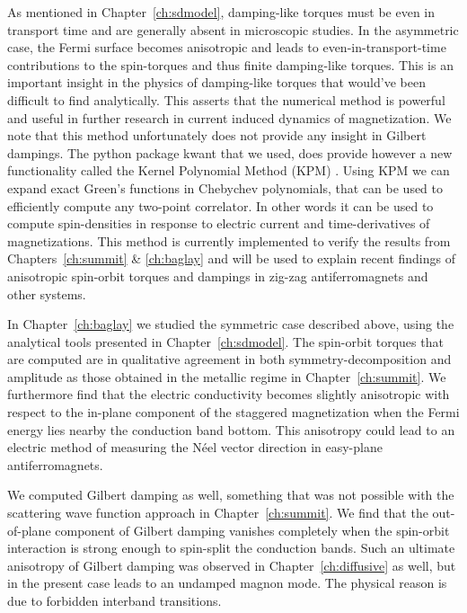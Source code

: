 As mentioned in Chapter~\ref{ch:sdmodel}, damping-like torques must be even in transport time and are generally absent in microscopic studies. In the asymmetric case, the Fermi surface becomes anisotropic and leads to even-in-transport-time contributions to the spin-torques and thus finite damping-like torques. This is an important insight in the physics of damping-like torques that would've been difficult to find analytically. This asserts that the numerical method is powerful and useful in further research in current induced dynamics of magnetization. We note that this method unfortunately does not provide any insight in Gilbert dampings. The python package kwant that we used, does provide however a new functionality called the Kernel Polynomial Method (KPM) \cite{weise_kernel_2006}. Using KPM we can expand exact Green's functions in Chebychev polynomials, that can be used to efficiently compute any two-point correlator. In other words it can be used to compute spin-densities in response to electric current and time-derivatives of magnetizations. This method is currently implemented to verify the results from Chapters~\ref{ch:summit} \& \ref{ch:baglay} and will be used to explain recent findings of anisotropic spin-orbit torques and dampings in zig-zag antiferromagnets and other systems.

In Chapter~\ref{ch:baglay} we studied the symmetric case described above, using the analytical tools presented in Chapter~\ref{ch:sdmodel}. The spin-orbit torques that are computed are in qualitative agreement in both symmetry-decomposition and amplitude as those obtained in the metallic regime in Chapter~\ref{ch:summit}. We furthermore find that the electric conductivity becomes slightly anisotropic with respect to the in-plane component of the staggered magnetization when the Fermi energy lies nearby the conduction band bottom. This anisotropy could lead to an electric method of measuring the N\'eel vector direction in easy-plane antiferromagnets. 

We computed Gilbert damping as well, something that was not possible with the scattering wave function approach in Chapter~\ref{ch:summit}. We find that the out-of-plane component of Gilbert damping vanishes completely when the spin-orbit interaction is strong enough to spin-split the conduction bands. Such an ultimate anisotropy of Gilbert damping was observed in Chapter~\ref{ch:diffusive} as well, but in the present case leads to an undamped magnon mode. The physical reason is due to forbidden interband transitions. 

